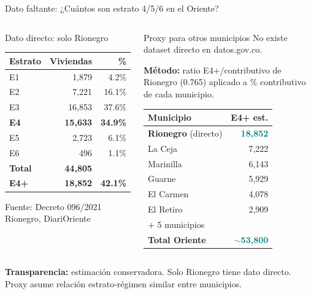 \documentclass[aspectratio=169, 11pt]{beamer}
\newcommand{\highlight}[1]{\textcolor{teal}{\textbf{#1}}}
\begin{document}
{
\begin{frame}{Dato faltante: ¿Cuántos son estrato 4/5/6 en el Oriente?}

\begin{columns}[T]
\begin{alertblock}{\small Dato directo: solo Rionegro}
\scriptsize
\begin{tabular}{@{}lrr@{}}
\toprule
\textbf{Estrato} & \textbf{Viviendas} & \textbf{\%} \\
\midrule
E1 & 1,879 & 4.2\% \\
E2 & 7,221 & 16.1\% \\
E3 & 16,853 & 37.6\% \\
\rowcolor{teal!10}
\textbf{E4} & \textbf{15,633} & \textbf{34.9\%} \\
\rowcolor{teal!8}
E5 & 2,723 & 6.1\% \\
\rowcolor{teal!6}
E6 & 496 & 1.1\% \\
\midrule
\textbf{Total} & \textbf{44,805} & \\
\rowcolor{teal!12}
\textbf{E4+} & \textbf{18,852} & \textbf{42.1\%} \\
\bottomrule
\end{tabular}

\vspace{3pt}
{\tiny Fuente: Decreto 096/2021 Rionegro, DiariOriente}
\end{alertblock}

\begin{block}{\small Proxy para otros municipios}
\footnotesize
No existe dataset directo en datos.gov.co.

\vspace{3pt}
\textbf{Método:} ratio E4+/contributivo de Rionegro (0.765) aplicado a \% contributivo de cada municipio.

\vspace{4pt}
\scriptsize
\begin{tabular}{@{}lr@{}}
\toprule
\textbf{Municipio} & \textbf{E4+ est.} \\
\midrule
\textbf{Rionegro} (directo) & \highlight{18,852} \\
La Ceja & 7,222 \\
Marinilla & 6,143 \\
Guarne & 5,929 \\
El Carmen & 4,078 \\
El Retiro & 2,909 \\
{\tiny + 5 municipios} & \\
\midrule
\textbf{Total Oriente} & \highlight{$\sim$53,800} \\
\bottomrule
\end{tabular}
\end{block}
\end{columns}

\vspace{2pt}
{\tiny\textcolor{amber!80!black}{\textbf{Transparencia:}} estimación conservadora. Solo Rionegro tiene dato directo. Proxy asume relación estrato-régimen similar entre municipios.}
\end{frame}
}
\end{document}

